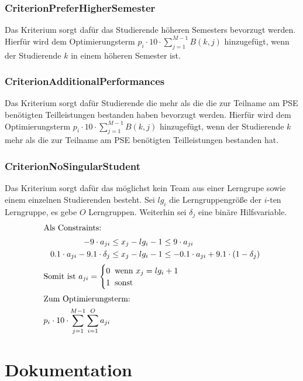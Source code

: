 \documentclass[parskip=full]{scrartcl}
\begin{document}
\subsubsection{CriterionPreferHigherSemester}
Das Kriterium sorgt dafür das Studierende höheren Semesters bevorzugt werden.
Hierfür wird dem Optimierungsterm $p_i \cdot 10 \cdot \sum_{j = 1}^{M-1} B(k,j)$ hinzugefügt, wenn der
Studierende $k$ in einem höheren Semester ist.
\subsubsection{CriterionAdditionalPerformances}
Das Kriterium sorgt dafür Studierende die mehr als die die zur Teilname am PSE
benötigten Teilleistungen bestanden haben bevorzugt werden. Hierfür wird dem Optimierungsterm
$p_i \cdot 10 \cdot \sum_{j = 1}^{M-1} B(k,j)$ hinzugefügt, wenn der Studierende
$k$ mehr als die zur Teilname am PSE benötigten Teilleistungen bestanden hat.
\subsubsection{CriterionNoSingularStudent}
Das Kriterium sorgt dafür das möglichst kein Team aus einer Lerngrupe sowie
einem einzelnen Studierenden besteht.
Sei $lg_i$ die Lerngruppengröße der $i$-ten Lerngruppe, es gebe $O$ Lerngruppen.
Weiterhin sei $\delta_j$ eine binäre Hilfsvariable.
\begin{align*}
\intertext{Als Constraints:} 
-9 \cdot a_{ji} &\le x_j -lg_i -1 \le 9\cdot a_{ji}\\
0.1 \cdot a_{ji} - 9.1 \cdot \delta_j &\le x_j -lg_i -1 \le -0.1 \cdot a_{ji} +
9.1 \cdot (1-\delta_j)\\
\intertext{$\text{Somit ist } a_{ji} = \begin{cases}
    0 \;\; \text{wenn $x_j = lg_i +1$} \\
    1 \;\; \text{sonst} 
\end{cases}$}
\intertext{Zum Optimierungsterm: }
p_i \cdot 10 \cdot \sum_{j = 1}^{M-1} \sum_{i = 1}^{O}a_{ji}
\end{align*}
\pagebreak
\section{Dokumentation}







\end{document}
